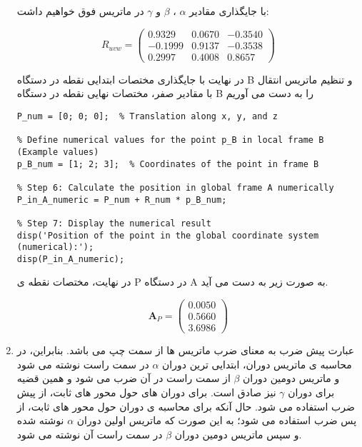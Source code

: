 \begin{enumerate}
با جایگذاری مقادیر $\alpha$ ، $\beta$ و $\gamma$ در ماتریس فوق خواهیم داشت:

\[
R_{uvw} = \left(\begin{array}{ccc} 
	0.9329 & 0.0670 & -0.3540 \\
	-0.1999 & 0.9137 & -0.3538 \\
	0.2997 & 0.4008 & 0.8657
\end{array}\right)
\]

در نهایت با جایگذاری مختصات ابتدایی نقطه در دستگاه B و تنظیم ماتریس انتقال با مقادیر صفر، مختصات نهایی نقطه در دستگاه B را به دست می آوریم

\begin{latin}
	\begin{lstlisting}[frame=single,style=Matlab-Pyglike]
% Define numerical values for the translation vector P (Example values)
P_num = [0; 0; 0];  % Translation along x, y, and z

% Define numerical values for the point p_B in local frame B (Example values)
p_B_num = [1; 2; 3];  % Coordinates of the point in frame B

% Step 6: Calculate the position in global frame A numerically
P_in_A_numeric = P_num + R_num * p_B_num;

% Step 7: Display the numerical result
disp('Position of the point in the global coordinate system (numerical):');
disp(P_in_A_numeric);
	\end{lstlisting}
\end{latin}
در نهایت، مختصات نقطه ی P در دستگاه A به صورت زیر به دست می آید.

\[
\mathbf{A}_P = \left(\begin{array}{c} 
	0.0050 \\
	0.5660 \\
	3.6986
\end{array}\right)
\]

\item 
عبارت پیش ضرب به معنای ضرب ماتریس ها از سمت چپ می باشد. بنابراین، در محاسبه ی ماتریس دوران، ابتدایی ترین دوران $\alpha$ در سمت راست نوشته می شود و ماتریس دومین دوران $\beta$ از سمت راست در آن ضرب می شود و همین قضیه برای دوران $\gamma$ نیز صادق است. برای دوران های حول محور های ثابت، از پیش ضرب استفاده می شود. 
حال آنکه برای محاسبه ی دوران حول محور های ثابت، از پس ضرب استفاده می شود؛ به این صورت که ماتریس اولین دوران $\alpha$ نوشته شده و سپس ماتریس دومین دوران $\beta$ در سمت راست آن نوشته می شود. 

\end{enumerate}



